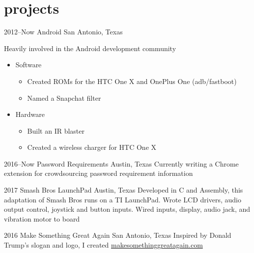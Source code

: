 \documentclass[]{friggeri-cv} %
\begin{document}
\section{projects}
\vspace{-10pt}
\begin{entrylist}

	\entry
	{2012--Now}
	{Android}
	{San Antonio, Texas}
	{Heavily involved in the Android development community
		\begin{itemize}
			\item Software
				\begin{itemize}
					\item Created ROMs for the HTC One X and OnePlus One (adb/fastboot)
					\item Named a Snapchat filter
				\end{itemize}
			\item Hardware
				\begin{itemize}
					\item Built an IR blaster
					\item Created a wireless charger for HTC One X
				\end{itemize}
		\end{itemize}
	}


	\entry
	{2016--Now}
	{Password Requirements}
	{Austin, Texas}
	{Currently writing a Chrome extension for crowdsourcing password requirement information}


	\entry
	{2017}
	{Smash Bros LaunchPad}
	{Austin, Texas}
	{Developed in C and Assembly, this adaptation of Smash Bros runs on a TI LaunchPad. Wrote LCD drivers, audio output control, joystick and button inputs. Wired inputs, display, audio jack, and vibration motor to board}


	\entry
	{2016}
	{Make Something Great Again}
	{San Antonio, Texas}
	{Inspired by Donald Trump's slogan and logo, I created \href{http://makesomethinggreatagain.com}{makesomethinggreatagain.com}}



\end{entrylist}
\end{document}
